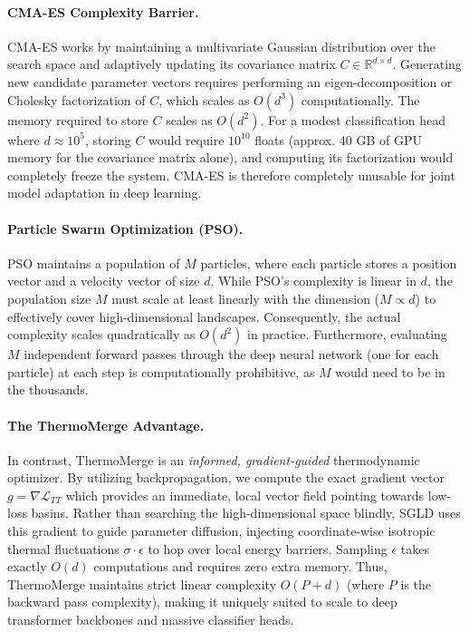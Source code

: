 \documentclass{article}
\theoremstyle{plain}
\theoremstyle{definition}
\theoremstyle{remark}
\begin{document}
\paragraph{CMA-ES Complexity Barrier.} CMA-ES works by maintaining a multivariate Gaussian distribution over the search space and adaptively updating its covariance matrix $C \in \mathbb{R}^{d \times d}$. Generating new candidate parameter vectors requires performing an eigen-decomposition or Cholesky factorization of $C$, which scales as $O(d^3)$ computationally. The memory required to store $C$ scales as $O(d^2)$. For a modest classification head where $d \approx 10^5$, storing $C$ would require $10^{10}$ floats (approx. 40 GB of GPU memory for the covariance matrix alone), and computing its factorization would completely freeze the system. CMA-ES is therefore completely unusable for joint model adaptation in deep learning.

\paragraph{Particle Swarm Optimization (PSO).} PSO maintains a population of $M$ particles, where each particle stores a position vector and a velocity vector of size $d$. While PSO's complexity is linear in $d$, the population size $M$ must scale at least linearly with the dimension ($M \propto d$) to effectively cover high-dimensional landscapes. Consequently, the actual complexity scales quadratically as $O(d^2)$ in practice. Furthermore, evaluating $M$ independent forward passes through the deep neural network (one for each particle) at each step is computationally prohibitive, as $M$ would need to be in the thousands.

\paragraph{The ThermoMerge Advantage.} In contrast, ThermoMerge is an \emph{informed, gradient-guided} thermodynamic optimizer. By utilizing backpropagation, we compute the exact gradient vector $g = \nabla \mathcal{L}_{TT}$ which provides an immediate, local vector field pointing towards low-loss basins. Rather than searching the high-dimensional space blindly, SGLD uses this gradient to guide parameter diffusion, injecting coordinate-wise isotropic thermal fluctuations $\sigma \cdot \epsilon$ to hop over local energy barriers. Sampling $\epsilon$ takes exactly $O(d)$ computations and requires zero extra memory. Thus, ThermoMerge maintains strict linear complexity $O(P + d)$ (where $P$ is the backward pass complexity), making it uniquely suited to scale to deep transformer backbones and massive classifier heads.
\end{document}
